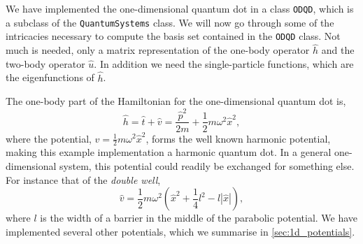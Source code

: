 We have implemented 
the one-dimensional quantum dot in a class \lstinline{ODQD}, which is a subclass of 
the \lstinline{QuantumSystems} class. We will now go through some of the intricacies 
necessary to compute the basis set contained in the \lstinline{ODQD} class. Not much is 
needed, only a matrix representation of the one-body operator $\hat{h}$ and the two-body 
operator $\hat{u}$. In addition we need the single-particle functions, which are the 
eigenfunctions of $\hat{h}$.

The one-body part of the Hamiltonian for the one-dimensional quantum 
dot is,
\begin{equation}
    \label{eq:1d_ho_hamiltonian}
    \hat{h} = \hat{t} + \hat{v} = \frac{\hat{p}^2}{2m} + \frac{1}{2}m \omega^2\hat{x}^2,
\end{equation}
where the potential, $\hat{v} = \frac{1}{2}m \omega^2\hat{x}^2$, forms the well known 
harmonic potential, making this example implementation a harmonic quantum dot.
In a general one-dimensional system, this potential could 
readily be exchanged for something else. For instance that of the 
\emph{double well},
\begin{equation}
    \hat{v} = \frac{1}{2} m \omega^2
        \left(\hat{x}^2 + \frac{1}{4}l^2 - l |\hat{x}|\right),
\end{equation}
where $l$ is the width of a barrier in the middle of the parabolic 
potential. We have implemented several other potentials, which we summarise 
in \autoref{sec:1d_potentials}.

